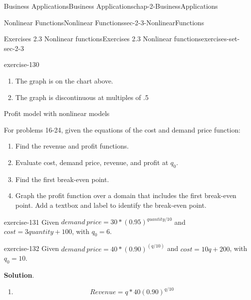 \documentclass[oneside,10pt,]{book}
\numberwithin{equation}{section}
\begin{document}
\begin{chapterptx}{Business Applications}{}{Business Applications}{}{}{chap-2-BusinessApplications}
\begin{sectionptx}{Nonlinear Functions}{}{Nonlinear Functions}{}{}{sec-2-3-NonlinearFunctions}
\begin{exercises-subsection-numberless}{Exercises 2.3 Nonlinear functions}{}{Exercises 2.3 Nonlinear functions}{}{}{exercises-set-sec-2-3}
\begin{exercisegroup}
\begin{divisionexerciseeg}{15}{}{}{exercise-130}
\begin{enumerate}[label=(\alph*)]
\begin{sidebyside}{1}{0.05}{0.05}{0}
\begin{sbspanel}{0.9}
\end{sbspanel}%
\end{sidebyside}%
%
\item\hypertarget{li-254}{}\hypertarget{p-865}{}%
The graph is on the chart above.%
\item\hypertarget{li-255}{}\hypertarget{p-866}{}%
The graph is discontinuous at multiples of .5%
\end{enumerate}
\end{divisionexerciseeg}%
\end{exercisegroup}
\par\medskip\noindent
\par\medskip\noindent%
\hypertarget{exercisegroup-12}{}%
\hypertarget{p-867}{}%
Profit model with nonlinear models%
\par
\hypertarget{p-868}{}%
For problems 16-24, given the equations of the cost and demand price function:%
\leavevmode%
\begin{enumerate}[label=(\alph*)]
\item\hypertarget{li-256}{}\hypertarget{p-869}{}%
Find the revenue and profit functions.%
\item\hypertarget{li-257}{}\hypertarget{p-870}{}%
Evaluate cost, demand price, revenue, and profit at \(q_0\).%
\item\hypertarget{li-258}{}\hypertarget{p-871}{}%
Find the first break-even point.%
\item\hypertarget{li-259}{}\hypertarget{p-872}{}%
Graph the profit function over a domain that includes the first break-even point.  Add a textbox and label to identify the break-even point.%
\end{enumerate}
\begin{exercisegroup}
\begin{divisionexerciseeg}{16}{}{}{exercise-131}%
\hypertarget{p-873}{}%
Given \(demand\ price=30*(0.95)^{quantity/10}\) and \(cost=3 quantity+100\), with \(q_0=6\).%
\end{divisionexerciseeg}%
\begin{divisionexerciseeg}{17}{}{}{exercise-132}%
\hypertarget{p-874}{}%
Given \(demand\ price=40*(0.90)^{(q/10)}\) and \(cost=10 q+200\), with \(q_0=10\).%
\par\smallskip%
\noindent\textbf{Solution}.\hypertarget{solution-64}{}\quad%
\leavevmode%
\begin{enumerate}[label=(\alph*)]
\item\hypertarget{li-260}{}%
\begin{equation*}
Revenue=q*40(0.90)^{q/10}
\end{equation*}

\end{enumerate}
\end{divisionexerciseeg}
\end{exercisegroup}
\end{exercises-subsection-numberless}
\end{sectionptx}
\end{chapterptx}
\end{document}
